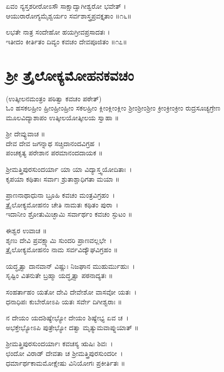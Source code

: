 ಏವಂ ನ್ಯಸ್ತಶರೀರೋಽಸೌ ಸಾಕ್ಷಾದ್ವಾಗೀಶ್ವರೋ ಭವೇತ್ ।\\
ಆಯುರಾರೋಗ್ಯಮೈಶ್ವರ್ಯಂ ಸರ್ವಶಾಸ್ತ್ರಪ್ರವಕ್ತೃತಾಂ ॥೧೬॥

ಲಭತೇ ನಾತ್ರ ಸಂದೇಹೋ ಹಯಗ್ರೀವಪ್ರಸಾದತಃ ।\\
ಇತೀದಂ ಕೀರ್ತಿತಂ ದಿವ್ಯಂ ಕವಚಂ ದೇವಪೂಜಿತಂ ॥೧೭॥



\section{ಶ್ರೀ ತ್ರೈಲೋಕ್ಯಮೋಹನಕವಚಂ }
(ಉತ್ಕೀಲನಮಂತ್ರಂ ಪಠಿತ್ವಾ ಕವಚಂ ಪಠೇತ್)\\
ಓಂ ಹಸಕಲಹ್ರೀಂ ಹ್ರೀಂಹ್ರೀಂಹ್ರೀಂ ಸಕಲಹ್ರೀಂ ಕ್ಲೀಂಕ್ಲೀಂಕ್ಲೀಂ  ಶ್ರೀಂಶ್ರೀಂಶ್ರೀಂ ಕ್ರೀಂಕ್ರೀಂಕ್ರೀಂ ರುದ್ರಸೂಚ್ಯಗ್ರೇಣ ಮೂಲವಿದ್ಯಾಶಾಪಂ ಉತ್ಕೀಲಯೋತ್ಕೀಲಯ ಸ್ವಾಹಾ ॥

ಶ್ರೀ ದೇವ್ಯುವಾಚ ॥\\
ದೇವ ದೇವ ಜಗನ್ನಾಥ ಸಚ್ಚಿದಾನಂದವಿಗ್ರಹ~।\\
ಪಂಚಕೃತ್ಯ ಪರೇಶಾನ ಪರಮಾನಂದದಾಯಕ ॥

ಶ್ರೀಮತ್ತ್ರಿಪುರಸುಂದರ್ಯಾ ಯಾ ಯಾ ವಿದ್ಯಾಸ್ತ್ವಯೋದಿತಾಃ~।\\
ಕೃಪಯಾ ಕಥಿತಾಃ ಸರ್ವಾಃ ಶ್ರುತಾಶ್ಚಾಧಿಗತಾ ಮಯಾ ॥

ಪ್ರಾಣನಾಥಾಧುನಾ ಬ್ರೂಹಿ ಕವಚಂ ಮಂತ್ರವಿಗ್ರಹಂ~।\\
ತ್ರೈಲೋಕ್ಯಮೋಹನಂ ಚೇತಿ ನಾಮತಃ ಕಥಿತಂ ಪುರಾ~।\\
ಇದಾನೀಂ ಶ್ರೋತುಮಿಚ್ಛಾಮಿ ಸರ್ವಾರ್ಥಂ ಕವಚಂ ಸ್ಫುಟಂ ॥

ಈಶ್ವರ ಉವಾಚ ॥\\
ಶೃಣು ದೇವಿ ಪ್ರವಕ್ಷ್ಯಾಮಿ ಸುಂದರಿ ಪ್ರಾಣವಲ್ಲಭೇ~।\\
ತ್ರೈಲೋಕ್ಯಮೋಹನಂ ನಾಮ ಸರ್ವವಿದ್ಯೌಘವಿಗ್ರಹಂ ॥

ಯದ್ಧೃತ್ವಾ ದಾನವಾನ್ ವಿಷ್ಣುಃ ನಿಜಘಾನ ಮುಹುರ್ಮುಹುಃ~।\\
ಸೃಷ್ಟಿಂ ವಿತನುತೇ ಬ್ರಹ್ಮಾ ಯದ್ಧೃತ್ವಾ ಪಠನಾದ್ಯತಃ ॥

ಸಂಹರ್ತಾಹಂ ಯತೋ ದೇವಿ ದೇವೇಶೋ ವಾಸವೋ ಯತಃ~।\\
ಧನಾಧಿಪಃ ಕುಬೇರೋಽಪಿ ಯತಃ ಸರ್ವೇ ದಿಗೀಶ್ವರಾಃ ॥

ನ ದೇಯಂ ಯದಶಿಷ್ಯೇಭ್ಯೋ ದೇಯಂ ಶಿಷ್ಯೇಭ್ಯ ಏವ ಚ~।\\
ಅಭಕ್ತೇಭ್ಯೋಽಪಿ ಪುತ್ರೇಭ್ಯೋ ದತ್ವಾ ಮೃತ್ಯುಮವಾಪ್ನುಯಾತ್ ॥

ಶ್ರೀಮತ್ತ್ರಿಪುರಸುಂದರ್ಯಾಃ ಕವಚಸ್ಯ ಋಷಿಃ ಶಿವಃ~।\\
ಛಂದೋ ವಿರಾಡ್ ದೇವತಾ ಚ ಶ್ರೀಮತ್ತ್ರಿಪುರಸುಂದರೀ~।\\
ಧರ್ಮಾರ್ಥಕಾಮಮೋಕ್ಷೇಷು ವಿನಿಯೋಗಃ ಪ್ರಕೀರ್ತಿತಃ ॥\\

